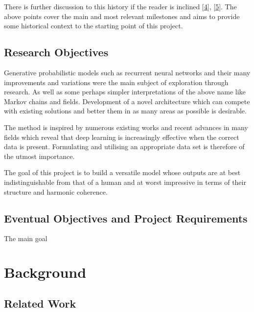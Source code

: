 \documentclass[12pt,]{article}
\begin{document}
There is further discussion to this history if the reader is inclined
{[}\protect\hyperlink{ref-mediumkylemcdonald}{4}{]},
{[}\protect\hyperlink{ref-libdlmusic}{5}{]}. The above points cover the
main and most relevant milestones and aims to provide some historical
context to the starting point of this project.

\hypertarget{research-objectives}{%
\subsection{Research Objectives}\label{research-objectives}}

Generative probabilistic models such as recurrent neural networks and
their many improvements and variations were the main subject of
exploration through research. As well as some perhaps simpler
interpretations of the above name like Markov chains and fields.
Development of a novel architecture which can compete with existing
solutions and better them in as many areas as possible is desirable.

The method is inspired by numerous existing works and recent advances in
many fields which reveal that deep learning is increasingly effective
when the correct data is present. Formulating and utilising an
appropriate data set is therefore of the utmost importance.

The goal of this project is to build a versatile model whose outputs are
at best indistinguishable from that of a human and at worst impressive
in terms of their structure and harmonic coherence.

\hypertarget{eventual-objectives-and-project-requirements}{%
\subsection{Eventual Objectives and Project
Requirements}\label{eventual-objectives-and-project-requirements}}

The main goal

\hypertarget{background}{%
\section{Background}\label{background}}

\hypertarget{related-work}{%
\subsection{Related Work}\label{related-work}}
\end{document}
